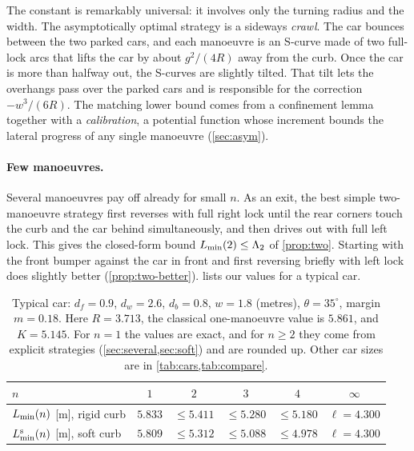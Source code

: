 The constant is remarkably universal: it involves only the turning radius and the width.
The asymptotically optimal strategy is a sideways \emph{crawl}.
The car bounces between the two parked cars, and each manoeuvre is an S-curve made of two full-lock arcs that lifts the car by about $g^2/(4R)$ away from the curb.
Once the car is more than halfway out, the S-curves are slightly tilted.
That tilt lets the overhangs pass over the parked cars and is responsible for the correction $-w^3/(6R)$.
The matching lower bound comes from a confinement lemma together with a \emph{calibration}, a potential function whose increment bounds the lateral progress of any single manoeuvre (\cref{sec:asym}).

\paragraph{Few manoeuvres.}
Several manoeuvres pay off already for small $n$.
As an exit, the best simple two-manoeuvre strategy first reverses with full right lock until the rear corners touch the curb and the car behind simultaneously, and then drives out with full left lock.
This gives the closed-form bound $L_{\min}(2)\le\Lambda_2$ of \cref{prop:two}.
Starting with the front bumper against the car in front and first reversing briefly with left lock does slightly better (\cref{prop:two-better}).
 lists our values for a typical car.

\begin{table}[ht]
\centering
\begin{tabular}{lccccc}
\toprule
$n$ & $1$ & $2$ & $3$ & $4$ & $\infty$\\
\midrule
$L_{\min}(n)$ [m], rigid curb & $5.833$ & $\le5.411$ & $\le5.280$ & $\le5.180$ & $\ell=4.300$\\
$L^{\mathrm s}_{\min}(n)$ [m], soft curb & $5.809$ & $\le5.312$ & $\le5.088$ & $\le4.978$ & $\ell=4.300$\\
\bottomrule
\end{tabular}
\caption{Typical car: $d_f=0.9$, $d_w=2.6$, $d_b=0.8$, $w=1.8$ (metres), $\theta=35^\circ$, margin $m=0.18$.
Here $R=3.713$, the classical one-manoeuvre value is $5.861$, and $K=5.145$.
For $n=1$ the values are exact, and for $n\ge2$ they come from explicit strategies (\cref{sec:several,sec:soft}) and are rounded up. Other car sizes are in \cref{tab:cars,tab:compare}.}
\label{tab:values}
\end{table}

